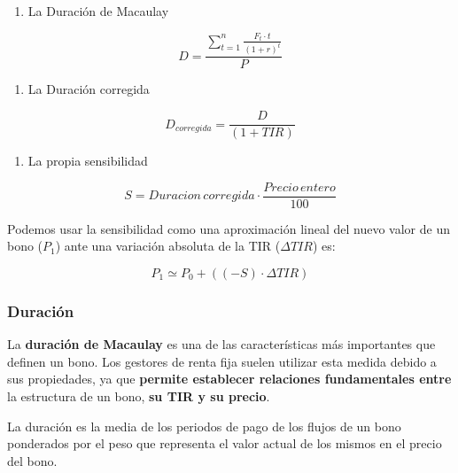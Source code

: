 \documentclass[
  letterpaper,
  DIV=11,
  numbers=noendperiod]{scrreprt}
\providecommand{\tightlist}{%
  \setlength{\itemsep}{0pt}\setlength{\parskip}{0pt}}\usepackage{longtable,booktabs,array}
\begin{document}
\begin{tcolorbox}
\begin{tcolorbox}[enhanced jigsaw, toprule=.15mm, left=2mm, arc=.35mm, breakable, bottomrule=.15mm, opacityback=0, rightrule=.15mm, leftrule=.75mm, colframe=quarto-callout-note-color-frame, colback=white]
\begin{minipage}[t]{\textwidth - 5.5mm}
\begin{enumerate}
\def\labelenumi{\arabic{enumi}.}
\tightlist
\item
  La Duración de Macaulay
\end{enumerate}

\[D=\frac{\sum_{t=1}^{n}\frac{F_t\cdot t}{\left(1+r\right)^t}}{P}\]

\begin{enumerate}
\def\labelenumi{\arabic{enumi}.}
\setcounter{enumi}{1}
\tightlist
\item
  La Duración corregida
\end{enumerate}

\[D_{corregida}=\frac{D}{\left(1+TIR\right)} \]

\begin{enumerate}
\def\labelenumi{\arabic{enumi}.}
\setcounter{enumi}{2}
\tightlist
\item
  La propia sensibilidad
\end{enumerate}

\[S= Duracion\,corregida \cdot \frac{Precio\,entero}{100}\]

Podemos usar la sensibilidad como una aproximación lineal del nuevo
valor de un bono (\(P_1\)) ante una variación absoluta de la TIR
(\(\Delta TIR\)) es:

\[P_1\simeq P_0 + ((-S)\cdot\Delta TIR)\]

\end{minipage}%
\end{tcolorbox}

\subsubsection{Duración}\label{duraciuxf3n}

La \textbf{duración de Macaulay} es una de las características más
importantes que definen un bono. Los gestores de renta fija suelen
utilizar esta medida debido a sus propiedades, ya que \textbf{permite
establecer relaciones fundamentales entre} la estructura de un bono,
\textbf{su TIR y su precio}.

La duración es la media de los periodos de pago de los flujos de un bono
ponderados por el peso que representa el valor actual de los mismos en
el precio del bono.

\begin{tcolorbox}[enhanced jigsaw, toprule=.15mm, left=2mm, arc=.35mm, breakable, bottomrule=.15mm, opacityback=0, rightrule=.15mm, leftrule=.75mm, colframe=quarto-callout-note-color-frame, colback=white]
\begin{minipage}[t]{5.5mm}
\textcolor{quarto-callout-note-color}{\faInfo}
\end{minipage}%
\begin{minipage}[t]{\textwidth - 5.5mm}


\end{minipage}
\end{tcolorbox}
\end{tcolorbox}
\end{document}
